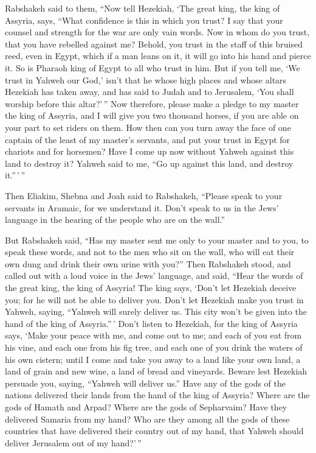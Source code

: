  Rabshakeh said to them, ``Now tell Hezekiah, `The great
king, the king of Assyria, says, ``What confidence is this in which you
trust?  I say that your counsel and strength for the war are
only vain words. Now in whom do you trust, that you have rebelled
against me?  Behold, you trust in the staff of this bruised
reed, even in Egypt, which if a man leans on it, it will go into his
hand and pierce it. So is Pharaoh king of Egypt to all who trust in him.
 But if you tell me, `We trust in Yahweh our God,' isn't
that he whose high places and whose altars Hezekiah has taken away, and
has said to Judah and to Jerusalem, `You shall worship before this
altar?'\,''  Now therefore, please make a pledge to my
master the king of Assyria, and I will give you two thousand horses, if
you are able on your part to set riders on them.  How then
can you turn away the face of one captain of the least of my master's
servants, and put your trust in Egypt for chariots and for horsemen?
 Have I come up now without Yahweh against this land to
destroy it? Yahweh said to me, ``Go up against this land, and destroy
it.''\,'\,''

 Then Eliakim, Shebna and Joah said to Rabshakeh, ``Please
speak to your servants in Aramaic, for we understand it. Don't speak to
us in the Jews' language in the hearing of the people who are on the
wall.''

 But Rabshakeh said, ``Has my master sent me only to your
master and to you, to speak these words, and not to the men who sit on
the wall, who will eat their own dung and drink their own urine with
you?''  Then Rabshakeh stood, and called out with a loud
voice in the Jews' language, and said, ``Hear the words of the great
king, the king of Assyria!  The king says, `Don't let
Hezekiah deceive you; for he will not be able to deliver you.
 Don't let Hezekiah make you trust in Yahweh, saying,
``Yahweh will surely deliver us. This city won't be given into the hand
of the king of Assyria.''\,'  Don't listen to Hezekiah, for
the king of Assyria says, `Make your peace with me, and come out to me;
and each of you eat from his vine, and each one from his fig tree, and
each one of you drink the waters of his own cistern;  until
I come and take you away to a land like your own land, a land of grain
and new wine, a land of bread and vineyards.  Beware lest
Hezekiah persuade you, saying, ``Yahweh will deliver us.'' Have any of
the gods of the nations delivered their lands from the hand of the king
of Assyria?  Where are the gods of Hamath and Arpad? Where
are the gods of Sepharvaim? Have they delivered Samaria from my hand?
 Who are they among all the gods of these countries that
have delivered their country out of my hand, that Yahweh should deliver
Jerusalem out of my hand?'\,''

